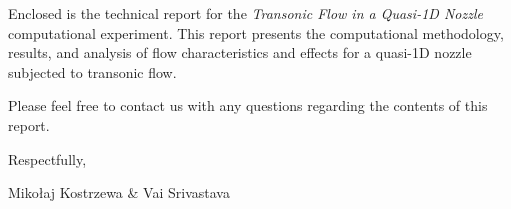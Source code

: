


\usepackage{cleveref}

\fancyhead[C]{}
\fancyheadwidth[L]{0.5\headwidth}
\fancyheadwidth[C]{0.0\headwidth}
\fancyheadwidth[R]{0.5\headwidth}







\hypertarget{titlepage}{\maketitle}
\thispagestyle{empty}

\pagebreak


\thispagestyle{empty}

\DTMtoday

\vspace{5.0ex}

Enclosed is the technical report for the \textit{Transonic Flow in a Quasi-1D Nozzle} computational experiment. This report presents the computational methodology, results, and analysis of flow characteristics and effects for a quasi-1D nozzle subjected to transonic flow.

Please feel free to contact us with any questions regarding the contents of this report.

\vspace{5.0ex}

Respectfully,

Mikołaj Kostrzewa \& Vai Srivastava

